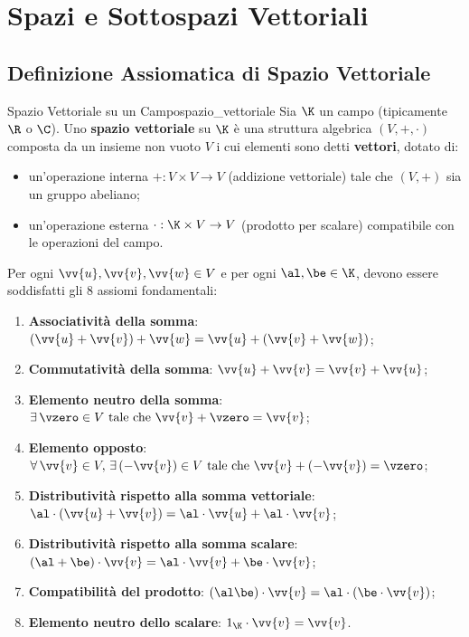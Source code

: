 
\chapter{Spazi e Sottospazi Vettoriali}
\label{chap:spazi_vettoriali}

\section{Definizione Assiomatica di Spazio Vettoriale}

\begin{definizione}{Spazio Vettoriale su un Campo}{spazio_vettoriale}
Sia $\K$ un campo (tipicamente $\R$ o $\C$). Uno \textbf{spazio vettoriale} su $\K$ è una struttura algebrica $(V, +, \cdot)$ composta da un insieme non vuoto $V$ i cui elementi sono detti \textbf{vettori}, dotato di:
\begin{itemize}
    \item un'operazione interna $+: V \times V \to V$ (addizione vettoriale) tale che $(V, +)$ sia un gruppo abeliano;
    \item un'operazione esterna $\cdot: \K \times V \to V$ (prodotto per scalare) compatibile con le operazioni del campo.
\end{itemize}
Per ogni $\vv{u}, \vv{v}, \vv{w} \in V$ e per ogni $\al, \be \in \K$, devono essere soddisfatti gli 8 assiomi fondamentali:
\begin{enumerate}[label=(\roman*)]
    \item \textbf{Associatività della somma}: $(\vv{u} + \vv{v}) + \vv{w} = \vv{u} + (\vv{v} + \vv{w})$;
    \item \textbf{Commutatività della somma}: $\vv{u} + \vv{v} = \vv{v} + \vv{u}$;
    \item \textbf{Elemento neutro della somma}: $\exists\, \vzero \in V \text{ tale che } \vv{v} + \vzero = \vv{v}$;
    \item \textbf{Elemento opposto}: $\forall\, \vv{v} \in V,\, \exists\, (-\vv{v}) \in V \text{ tale che } \vv{v} + (-\vv{v}) = \vzero$;
    \item \textbf{Distributività rispetto alla somma vettoriale}: $\al \cdot (\vv{u} + \vv{v}) = \al \cdot \vv{u} + \al \cdot \vv{v}$;
    \item \textbf{Distributività rispetto alla somma scalare}: $(\al + \be) \cdot \vv{v} = \al \cdot \vv{v} + \be \cdot \vv{v}$;
    \item \textbf{Compatibilità del prodotto}: $(\al \be) \cdot \vv{v} = \al \cdot (\be \cdot \vv{v})$;
    \item \textbf{Elemento neutro dello scalare}: $1_{\K} \cdot \vv{v} = \vv{v}$.
\end{enumerate}
\end{definizione}

